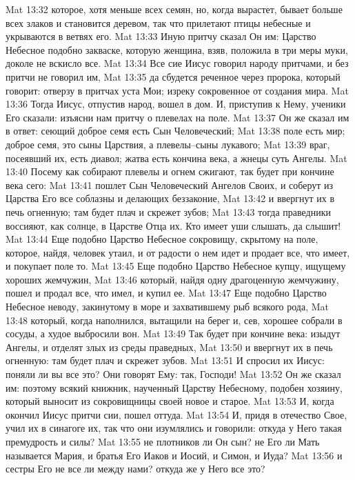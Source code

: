 Mat 13:32  которое, хотя меньше всех семян, но, когда вырастет, бывает больше всех злаков и становится деревом, так что прилетают птицы небесные и укрываются в ветвях его.
Mat 13:33  Иную притчу сказал Он им: Царство Небесное подобно закваске, которую женщина, взяв, положила в три меры муки, доколе не вскисло все.
Mat 13:34  Все сие Иисус говорил народу притчами, и без притчи не говорил им,
Mat 13:35  да сбудется реченное через пророка, который говорит: отверзу в притчах уста Мои; изреку сокровенное от создания мира.
Mat 13:36  Тогда Иисус, отпустив народ, вошел в дом. И, приступив к Нему, ученики Его сказали: изъясни нам притчу о плевелах на поле.
Mat 13:37  Он же сказал им в ответ: сеющий доброе семя есть Сын Человеческий;
Mat 13:38  поле есть мир; доброе семя, это сыны Царствия, а плевелы--сыны лукавого;
Mat 13:39  враг, посеявший их, есть диавол; жатва есть кончина века, а жнецы суть Ангелы.
Mat 13:40  Посему как собирают плевелы и огнем сжигают, так будет при кончине века сего:
Mat 13:41  пошлет Сын Человеческий Ангелов Своих, и соберут из Царства Его все соблазны и делающих беззаконие,
Mat 13:42  и ввергнут их в печь огненную; там будет плач и скрежет зубов;
Mat 13:43  тогда праведники воссияют, как солнце, в Царстве Отца их. Кто имеет уши слышать, да слышит!
Mat 13:44  Еще подобно Царство Небесное сокровищу, скрытому на поле, которое, найдя, человек утаил, и от радости о нем идет и продает все, что имеет, и покупает поле то.
Mat 13:45  Еще подобно Царство Небесное купцу, ищущему хороших жемчужин,
Mat 13:46  который, найдя одну драгоценную жемчужину, пошел и продал все, что имел, и купил ее.
Mat 13:47  Еще подобно Царство Небесное неводу, закинутому в море и захватившему рыб всякого рода,
Mat 13:48  который, когда наполнился, вытащили на берег и, сев, хорошее собрали в сосуды, а худое выбросили вон.
Mat 13:49  Так будет при кончине века: изыдут Ангелы, и отделят злых из среды праведных,
Mat 13:50  и ввергнут их в печь огненную: там будет плач и скрежет зубов.
Mat 13:51  И спросил их Иисус: поняли ли вы все это? Они говорят Ему: так, Господи!
Mat 13:52  Он же сказал им: поэтому всякий книжник, наученный Царству Небесному, подобен хозяину, который выносит из сокровищницы своей новое и старое.
Mat 13:53  И, когда окончил Иисус притчи сии, пошел оттуда.
Mat 13:54  И, придя в отечество Свое, учил их в синагоге их, так что они изумлялись и говорили: откуда у Него такая премудрость и силы?
Mat 13:55  не плотников ли Он сын? не Его ли Мать называется Мария, и братья Его Иаков и Иосий, и Симон, и Иуда?
Mat 13:56  и сестры Его не все ли между нами? откуда же у Него все это?
